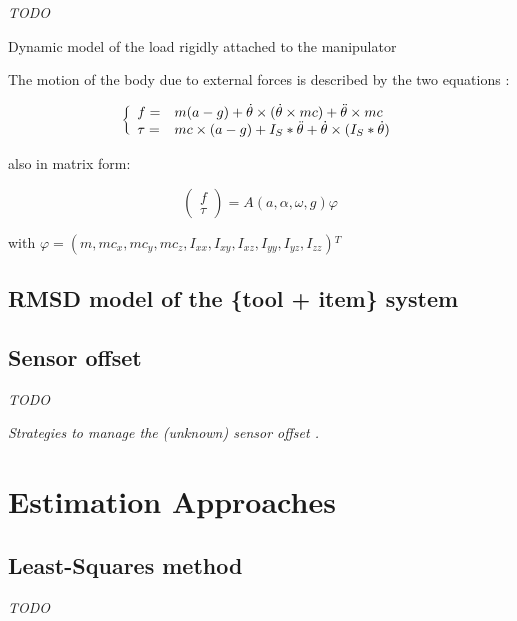 \documentclass[/home/francois/latex/report/main.tex]{subfiles}
\begin{document}
\textit{TODO}

Dynamic model of the load rigidly attached to the manipulator

The motion of the body due to external forces is described by the two equations \cite{Kubus2007, Kubus2008}:

\begin{equation}
 \label{dim_1}
 \left \{
 \begin{array}{l l}
  f =    & m (a - g) + \dot{\theta} \times (\dot{\theta} \times m c) + \ddot{\theta} \times m c \\
  \tau = & m c \times (a - g)
  + I_{S} \ast \ddot{\theta} + \dot{\theta} \times (I_{S} \ast \dot{\theta})
 \end{array}
 \right.
\end{equation}

also in matrix form:

\begin{equation}
 \begin{pmatrix}
  f    \\
  \tau
 \end{pmatrix}
 = A(a, \alpha, \omega, g) \varphi
\end{equation}

with $\varphi = (m, m c_x, m c_y, m c_z, I_{xx}, I_{xy}, I_{xz}, I_{yy}, I_{yz}, I_{zz}) {}^T$

\subsection{\ac{RMSD} model of the \{tool + item\} system}


\subsection{Sensor offset}

\textit{TODO}

{\it
Strategies to manage the (unknown) sensor offset \cite{Kubus2007, Kubus2008}.
}

\section{Estimation Approaches}

\subsection{Least-Squares method}

\textit{TODO}
\end{document}

